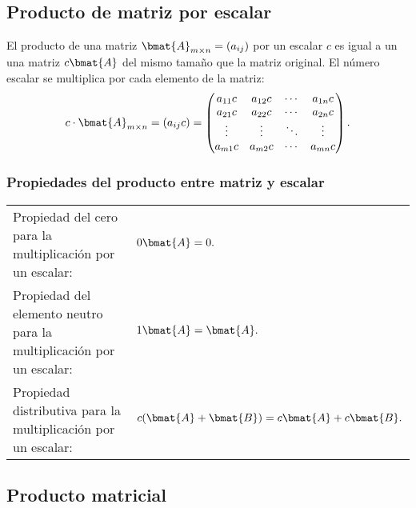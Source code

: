 \documentclass{fmbnotes}
\begin{document}
\subsection{Producto de matriz por escalar}

El producto de una matriz \( \bmat{A}_{m\times n} = (a_{ij}) \) por un escalar \( c \) es igual a un una matriz \( c\bmat{A} \) del mismo tamaño que la matriz original. El número escalar se multiplica por cada elemento de la matriz:
\[c \cdot \bmat{A}_{m\times n}=(a_{ij}c)=\begin{pmatrix}
	a_{11}c & a_{12}c & \cdots & a_{1n}c \\
	a_{21}c & a_{22}c & \cdots & a_{2n}c\\
	\vdots & \vdots & \ddots & \vdots  \\
	a_{m1}c & a_{m2}c & \cdots & a_{mn}c \\
	\end{pmatrix}.\]

\subsubsection{Propiedades del producto entre matriz y escalar}


\begin{tabular}{lp{}}
	\rule[1ex]{0pt}{2.5ex} Propiedad del cero para la multiplicación por un escalar: &  \(0\bmat{A} = 0.\) \\
	\rule[1ex]{0pt}{2.5ex} Propiedad del elemento neutro para la multiplicación por un escalar: &  \(1\bmat{A} = \bmat{A}.\)   \\
	\rule[1ex]{0pt}{2.5ex} Propiedad distributiva para la multiplicación por un escalar: &  \(c(\bmat{A} + \bmat{B}) = c\bmat{A} + c\bmat{B}.\)
\end{tabular}


\subsection{Producto matricial}
\end{document}
